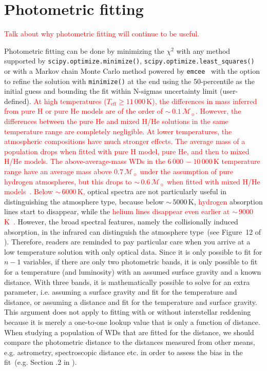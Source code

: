 \documentclass[fleqn,usenatbib]{rasti}
\newcommand{\msun}{\mathcal{M}_{\sun}}
\begin{document}
\section{Photometric fitting}
\textcolor{red}{Talk about why photometric fitting will continue to be useful.}


Photometric fitting can be done by minimizing the $\chi^2$ with any method
supported by \verb+scipy.optimize.minimize()+,
\verb+scipy.optimize.least_squares()+ or with a Markov chain Monte
Carlo method powered by \texttt{emcee}~\citep{2013PASP..125..306F} with the
option to refine the solution with \verb+minimize()+ at the end using the
50-percentile as the initial guess and bounding the fit within N-sigmas
uncertainty limit (user-defined). \textcolor{red}{At high temperatures
($T_{\mathrm{eff}} \geq 11\,000$\,K), the differences in mass inferred from
pure H or pure He models are of the order of $\sim$\,$0.1\,\msun$. However,
the differences between the pure He and mixed H/He solutions in the same
temperature range are completely negligible. At lower temperatures, the
atmospheric \textcolor{red}{compositions} have much stronger effects. The average mass of a
population drops when fitted with pure H model, pure He, and then to mixed
H/He models. The \textcolor{red}{above-average-mass} WDs in the $6\,000\,-10\,000$\,K temperature range
\textcolor{red}{have} an average mass above $0.7\,\msun$ under the assumption of pure hydrogen
atmospheres, but this drops to $\sim$\,$0.6\,\msun$ when fitted with mixed
H/He models~\citep{2019ApJ...876...67B}. Below $\sim$\,$6000$\,K,} optical
spectra are not particularly useful in distinguishing the atmosphere
type, because below $\sim$\,$5000$\,K, \textcolor{red}{hydrogen} absorption
lines start to disappear, while the \textcolor{red}{helium lines disappear
even earlier at $\sim$\,$9000$\,K~\citep{2018ApJ...857...56R}.} However, the
broad spectral features, namely the collisionally induced absorption, in the
infrared can distinguish the atmosphere type~(see Figure~12 of
\citealt{2017ApJ...848...36B}). Therefore, readers are reminded to pay
particular care when you arrive at a low temperature solution with only
optical data. Since it is only possible to fit for $n-1$ variables, if there
are only two photometric bands, it is only possible to fit for a temperature
(and luminosity) with an assumed surface gravity and a known distance. With
three bands, it is mathematically possible to solve for an extra parameter,
i.e. assuming a surface gravity and fit for the temperature and distance, or
assuming a distance and fit for the temperature and surface gravity. This
argument does not apply to fitting with or without interstellar reddening because
it is merely a one-to-one lookup value that is
only a function of distance. When studying a population of WDs that are fitted
for the distance, we should compare the photometric distance to the distances
measured from other means, e.g. astrometry, spectroscopic distance etc. in order
to assess the bias in the fit~(e.g. Section .2
in \citealt{2011MNRAS.417...93R}).
\end{document}
